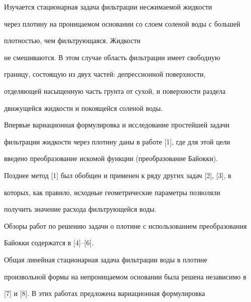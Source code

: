 \pagestyle{plain} %







\maketitle


\label{begin}








Изучается стационарная задача фильтрации несжимаемой жидкости


через плотину на проницаемом основании со слоем соленой воды с большей


плотностью, чем фильтрующаяся. Жидкости 


не смешиваются. В этом случае область фильтрации имеет свободную


границу, состоящую из двух частей: депрессионной поверхности,


отделяющей насыщенную часть грунта от сухой, и поверхности раздела


движущейся жидкости и покоящейся соленой воды.





Впервые вариационная формулировка и исследование простейшей задачи


фильтрации жидкости через плотину даны в работе [1], где для этой цели


введено преобразование искомой функции (преобразование Байокки).


Позднее метод [1] был обобщен и применен к ряду других задач [2], [3], в


которых, как правило, исходные геометрические параметры позволяли


получить значение расхода фильтрующейся воды.


Обзоры работ по решению задачи о плотине с использованием преобразования


Байокки содержатся в [4]--[6].





Общая линейная стационарная задача фильтрации воды в плотине


произвольной формы на непроницаемом основании была решена независимо в


[7] и [8]. В этих работах предложена вариационная формулировка


